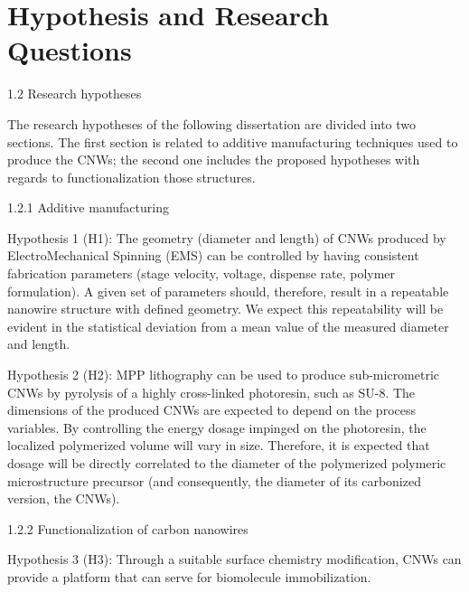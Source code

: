 
\chapter{Hypothesis and Research Questions} %

\label{Chapter:HypothesisandResearchQuestions}






1.2 Research hypotheses

The research hypotheses of the following dissertation are divided into two sections. The first section is related to additive manufacturing techniques used to produce the CNWs; the second one includes the proposed hypotheses with regards to functionalization those structures.

1.2.1 Additive manufacturing

Hypothesis 1 (H1): The geometry (diameter and length) of CNWs produced by ElectroMechanical Spinning (EMS) can be controlled by having consistent fabrication parameters (stage velocity, voltage, dispense rate, polymer formulation). A given set of parameters should, therefore, result in a repeatable nanowire structure with defined geometry. We expect this repeatability will be evident in the statistical deviation from a mean value of the measured diameter and length.

Hypothesis 2 (H2): MPP lithography can be used to produce sub-micrometric CNWs by pyrolysis of a highly cross-linked photoresin, such as SU-8. The dimensions of the produced CNWs are expected to depend on the process variables. By controlling the energy dosage impinged on the photoresin, the localized polymerized volume will vary in size. Therefore, it is expected that dosage will be directly correlated to the diameter of the polymerized polymeric microstructure precursor (and consequently, the diameter of its carbonized version, the CNWs).

1.2.2 Functionalization of carbon nanowires

Hypothesis 3 (H3): Through a suitable surface chemistry modification, CNWs can provide a platform that can serve for biomolecule immobilization.

